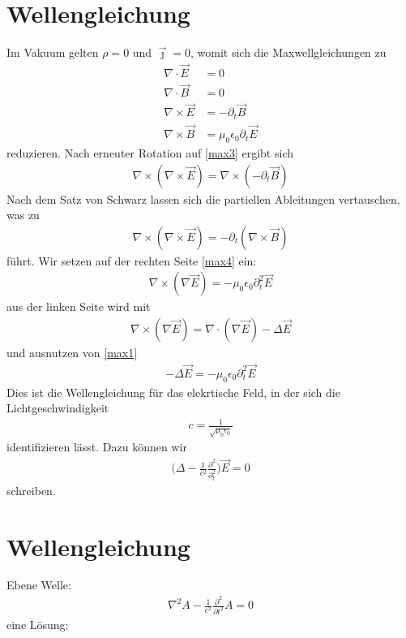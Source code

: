 \documentclass{scrartcl}
\begin{document}
 \section{Wellengleichung}
Im Vakuum gelten $\rho=0$ und $\vec{\jmath}=0$, womit sich die
Maxwellgleichungen zu
 \begin{align}
\nabla\cdot\vec{E} &= 0     \label{eqn:max1}\\
\nabla\cdot\vec{B} &= 0   \label{eqn:max2}  \\
\nabla\times\vec{E} &= -\partial_t\vec{B} \label{eqn:max3} \\
\nabla\times\vec{B} &= \mu_0\epsilon_0\partial_t{\vec{E}} \label{eqn:max4}
 \end{align}
 reduzieren. Nach erneuter Rotation auf \eqref{max3} ergibt sich
 \begin{align}
   \nabla\times(\nabla\times\vec{E}) = \nabla\times(-\partial_t\vec{B})
   \label{eqn:9}
 \end{align}
 Nach dem Satz von Schwarz lassen sich die partiellen Ableitungen
 vertauschen, was zu
 \begin{align}
   \nabla\times(\nabla\times\vec{E}) = -\partial_t(\nabla\times\vec{B})
   \label{eqn:10}
 \end{align}
 führt. Wir setzen auf der rechten Seite \eqref{max4} ein:
 \begin{align}
   \nabla\times(\nabla\vec{E})=-\mu_0\epsilon_0\partial_t^2\vec{E}
   \label{eqn:11}
 \end{align}
 aus der linken Seite wird mit
 \begin{align}
 \nabla\times(\nabla\vec{E})= \nabla\cdot(\nabla\vec{E})- \Delta\vec{E}
 \label{eqn:12}
 \end{align}
 und ausnutzen von \eqref{max1}
 \begin{align}
   -\Delta\vec{E}=-\mu_0\epsilon_0\partial_t^2\vec{E}
   \label{eqn:13}
 \end{align}
 Dies ist die Wellengleichung für das elekrtische Feld,
 in der sich die Lichtgeschwindigkeit
 \begin{align}
 c=\frac{1}{\sqrt{\mu_0\epsilon_0}} \label{eqn:14}
\end{align}
identifizieren lässt. Dazu können wir
\begin{align}
  \biggl(\Delta-\frac{1}{c^2}\frac{\partial^2}{\partial_t^2}\biggr)\vec{E}=0
\end{align}
\label{eqn:15}
schreiben.

\section{Wellengleichung}
Ebene Welle:
\begin{align}
  \nabla^2 A - \frac{1}{c^2}\frac{\partial^2}{\partial t^2}A= 0
\end{align}
eine Lösung:
\end{document}
